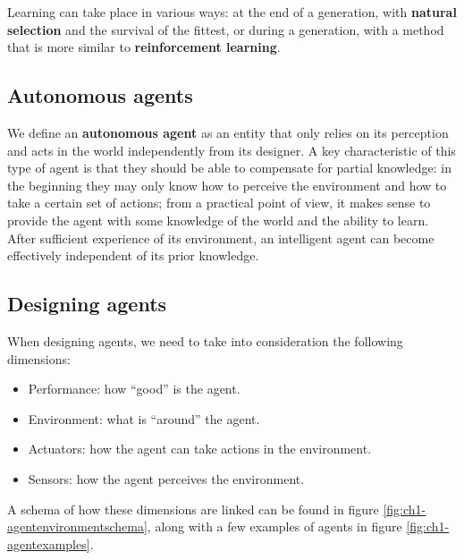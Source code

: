 Learning can take place in various ways: at the end of a generation, with \textbf{natural selection} and the survival of the fittest, or during a generation, with a method that is more similar to \textbf{reinforcement learning}.

\subsection{Autonomous agents}
We define an \textbf{autonomous agent} as an entity that only relies on its perception and acts in the world independently from its designer. A key characteristic of this type of agent is that they should be able to compensate for partial knowledge: in the beginning they may only know how to perceive the environment and how to take a certain set of actions; from a practical point of view, it makes sense to provide the agent with some knowledge of the world and the ability to learn. After sufficient experience of its environment, an intelligent agent can become effectively independent of its prior knowledge.

\subsection{Designing agents}
When designing agents, we need to take into consideration the following dimensions:

\begin{itemize}
    \item Performance: how ``good'' is the agent.
    \item Environment: what is ``around'' the agent.
    \item Actuators: how the agent can take actions in the environment.
    \item Sensors: how the agent perceives the environment.
\end{itemize}

A schema of how these dimensions are linked can be found in figure \ref{fig:ch1-agentenvironmentschema}, along with a few examples of agents in figure \ref{fig:ch1-agentexamples}.

